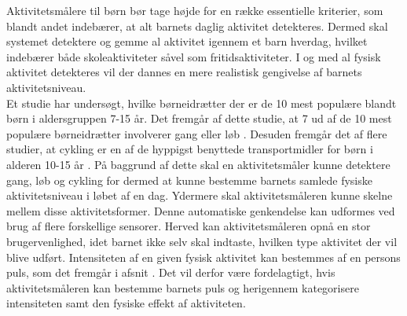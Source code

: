 Aktivitetsmålere til børn bør tage højde for en række essentielle kriterier, som blandt andet indebærer, at alt barnets daglig aktivitet detekteres. Dermed skal systemet detektere og gemme al aktivitet igennem et barn hverdag, hvilket indebærer både skoleaktiviteter såvel som fritidsaktiviteter. I og med al fysisk aktivitet detekteres vil der dannes en mere realistisk gengivelse af barnets aktivitetsniveau. \\%
Et studie har undersøgt, hvilke børneidrætter der er de 10 mest populære blandt børn i aldersgruppen 7-15 år. Det fremgår af dette studie, at 7 ud af de 10 mest populære børneidrætter involverer gang eller løb \citep{Asserhoej2013}. Desuden fremgår det af flere  studier, at cykling er en af de hyppigst benyttede transportmidler for børn i alderen 10-15 år \citep{DTU2014,COWI2015}. På baggrund af dette skal en aktivitetsmåler kunne detektere gang, løb og cykling for dermed at kunne bestemme barnets samlede fysiske aktivitetsniveau i løbet af en dag. Ydermere skal aktivitetsmåleren kunne skelne mellem disse aktivitetsformer. Denne automatiske genkendelse kan udformes ved brug af flere forskellige sensorer. Herved kan aktivitetsmåleren opnå en stor brugervenlighed, idet barnet ikke selv skal indtaste, hvilken type aktivitet der vil blive udført. \newline
Intensiteten af en given fysisk aktivitet kan bestemmes af en persons puls, som det fremgår i afsnit . Det vil derfor være fordelagtigt, hvis aktivitetsmåleren kan bestemme barnets puls og herigennem kategorisere intensiteten samt den fysiske effekt af aktiviteten.
%
%

